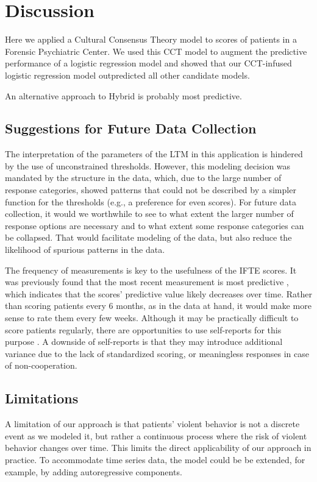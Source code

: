 \documentclass[a4paper,11pt]{article}
\begin{document}
\section{Discussion}
Here we applied a Cultural Consensus Theory model to scores of patients in a Forensic Psychiatric Center.
We used this CCT model to augment the predictive performance of a logistic regression model and showed that our CCT-infused logistic regression model outpredicted all other candidate models.

An alternative approach to
Hybrid is probably most predictive.

\subsection{Suggestions for Future Data Collection}

The interpretation of the parameters of the LTM in this application is hindered by the use of unconstrained thresholds.
However, this modeling decision was mandated by the structure in the data, which, due to the large number of response categories, showed patterns that could not be described by a simpler function for the thresholds (e.g., a preference for even scores).
For future data collection, it would we worthwhile to see to what extent the larger number of response options are necessary and to what extent some response categories can be collapsed.
That would facilitate modeling of the data, but also reduce the likelihood of spurious patterns in the data.

The frequency of measurements is key to the usefulness of the IFTE scores.
It was previously found that the most recent measurement is most predictive \parencite{schuringa2019inpatient}, which indicates that the scores' predictive value likely decreases over time.
Rather than scoring patients every 6 months, as in the data at hand, it would make more sense to rate them every few weeks.
Although it may be practically difficult to score patients regularly, there are opportunities to use self-reports for this purpose \parencite{tuente2021mapping, bousardt2016predicting}.
A downside of self-reports is that they may introduce additional variance due to the lack of standardized scoring, or meaningless responses in case of non-cooperation.

\subsection{Limitations}
A limitation of our approach is that patients' violent behavior is not a discrete event as we modeled it, but rather a continuous process where the risk of violent behavior changes over time.
This limits the direct applicability of our approach in practice.
To accommodate time series data, the model could be be extended, for example, by adding autoregressive components.
\end{document}
